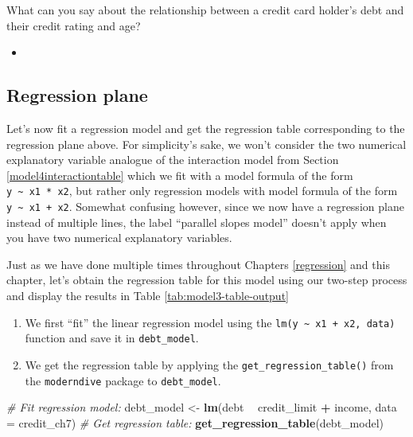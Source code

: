 \documentclass[12pt, krantz2,]{krantz}
\makeatletter
\newenvironment{Shaded}{\begin{snugshade}}{\end{snugshade}}
\newcommand{\CommentTok}[1]{\textcolor[rgb]{0.37,0.37,0.37}{\textit{#1}}}
\newcommand{\DataTypeTok}[1]{\textcolor[rgb]{0.27,0.27,0.27}{#1}}
\newcommand{\KeywordTok}[1]{\textcolor[rgb]{0.27,0.27,0.27}{\textbf{#1}}}
\newcommand{\NormalTok}[1]{#1}
\newcommand{\OperatorTok}[1]{\textcolor[rgb]{0.43,0.43,0.43}{\textbf{#1}}}
\newcommand{\StringTok}[1]{\textcolor[rgb]{0.5,0.5,0.5}{#1}}
\providecommand{\tightlist}{%
  \setlength{\itemsep}{0pt}\setlength{\parskip}{0pt}}
\newenvironment{kframe}{%
\medskip{}
\setlength{\fboxsep}{.8em}
 \def\at@end@of@kframe{}%
 \ifinner\ifhmode%
  \def\at@end@of@kframe{\end{minipage}}%
  \begin{minipage}{\columnwidth}%
 \fi\fi%
 \def\FrameCommand##1{\hskip\@totalleftmargin \hskip-\fboxsep
 \colorbox{shadecolor}{##1}\hskip-\fboxsep
     \hskip-\linewidth \hskip-\@totalleftmargin \hskip\columnwidth}%
 \MakeFramed {\advance\hsize-\width
   \@totalleftmargin\z@ \linewidth\hsize
   \@setminipage}}%
 {\par\unskip\endMakeFramed%
 \at@end@of@kframe}
\renewenvironment{Shaded}{\begin{kframe}}{\end{kframe}}
\newenvironment{rmdblock}[1]
  {\begin{shaded*}
  \begin{itemize}
  \renewcommand{\labelitemi}{
    \raisebox{-.7\height}[0pt][0pt]{
    }
  }
  \item
  }
  {
  \end{itemize}
  \end{shaded*}
  }
\newenvironment{learncheck}
  {\begin{rmdblock}{warning}}
  {\end{rmdblock}}
\makeatother
\begin{document}
What can you say about the relationship between a credit card holder's debt and their credit rating and age?

\begin{learncheck}

\end{learncheck}

\hypertarget{model3table}{%
\subsection{Regression plane}\label{model3table}}

Let's now fit a regression model and get the regression table corresponding to the regression plane above. For simplicity's sake, we won't consider the two numerical explanatory variable analogue of the interaction model from Section \ref{model4interactiontable} which we fit with a model formula of the form \texttt{y\ \textasciitilde{}\ x1\ *\ x2}, but rather only regression models with model formula of the form \texttt{y\ \textasciitilde{}\ x1\ +\ x2}. Somewhat confusing however, since we now have a regression plane instead of multiple lines, the label ``parallel slopes model'' doesn't apply when you have two numerical explanatory variables.

Just as we have done multiple times throughout Chapters \ref{regression} and this chapter, let's obtain the regression table for this model using our two-step process and display the results in Table \ref{tab:model3-table-output}

\begin{enumerate}
\def\labelenumi{\arabic{enumi}.}
\tightlist
\item
  We first ``fit'' the linear regression model using the \texttt{lm(y\ \textasciitilde{}\ x1\ +\ x2,\ data)} function and save it in \texttt{debt\_model}.
\item
  We get the regression table by applying the \texttt{get\_regression\_table()} from the \texttt{moderndive} package to \texttt{debt\_model}.
\end{enumerate}

\begin{Shaded}
\begin{Highlighting}[]
\CommentTok{# Fit regression model:}
\NormalTok{debt_model <-}\StringTok{ }\KeywordTok{lm}\NormalTok{(debt }\OperatorTok{~}\StringTok{ }\NormalTok{credit_limit }\OperatorTok{+}\StringTok{ }\NormalTok{income, }\DataTypeTok{data =}\NormalTok{ credit_ch7)}
\CommentTok{# Get regression table:}
\KeywordTok{get_regression_table}\NormalTok{(debt_model)}
\end{Highlighting}
\end{Shaded}
\end{document}
